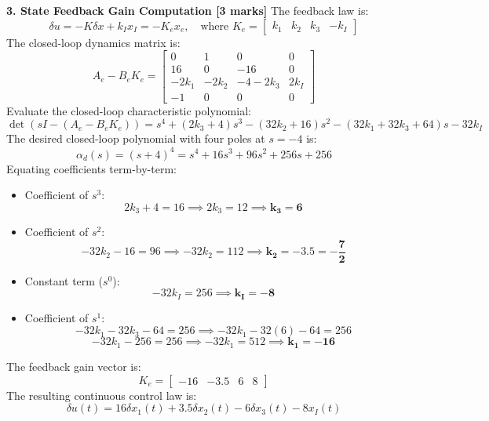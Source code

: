 \documentclass[12pt,onecolumn,twoside ]{article}
\begin{document}
	\textbf{3. State Feedback Gain Computation [3 marks]} The feedback law is: \[
	\delta u = -K \delta x + k_I x_I = -K_e x_e, \quad \text{where } K_e = \begin{bmatrix} k_1 & k_2 & k_3 & -k_I \end{bmatrix}
	\] The closed-loop dynamics matrix is: \[
	A_e - B_e K_e = \begin{bmatrix} 0 & 1 & 0 & 0 \\ 16 & 0 & -16 & 0 \\ -2k_1 & -2k_2 & -4 - 2k_3 & 2k_I \\ -1 & 0 & 0 & 0 \end{bmatrix}
	\] Evaluate the closed-loop characteristic polynomial: \[
	\det(sI - (A_e - B_e K_e)) = s^4 + (2k_3 + 4)s^3 - (32k_2 + 16)s^2 - (32k_1 + 32k_3 + 64)s - 32k_I
	\] The desired closed-loop polynomial with four poles at $s = -4$ is: \[
	\alpha_d(s) = (s + 4)^4 = s^4 + 16s^3 + 96s^2 + 256s + 256
	\] Equating coefficients term-by-term:
	\begin{itemize}
		\item
		Coefficient of $s^3$: \[
		2k_3 + 4 = 16 \implies 2k_3 = 12 \implies \mathbf{k_3 = 6}
		\]
		\item
		Coefficient of $s^2$: \[
		-32k_2 - 16 = 96 \implies -32k_2 = 112 \implies \mathbf{k_2 = -3.5 = -\frac{7}{2}}
		\]
		\item
		Constant term ($s^0$): \[
		-32k_I = 256 \implies \mathbf{k_I = -8}
		\]
		\item
		Coefficient of $s^1$: \[
		-32k_1 - 32k_3 - 64 = 256 \implies -32k_1 - 32(6) - 64 = 256
		\] \[
		-32k_1 - 256 = 256 \implies -32k_1 = 512 \implies \mathbf{k_1 = -16}
		\]
	\end{itemize}
	The feedback gain vector is: \[
	K_e = \begin{bmatrix} -16 & -3.5 & 6 & 8 \end{bmatrix}
	\] The resulting continuous control law is: \[
	\delta u(t) = 16 \delta x_1(t) + 3.5 \delta x_2(t) - 6 \delta x_3(t) - 8 x_I(t)
	\]
	
\end{document}
